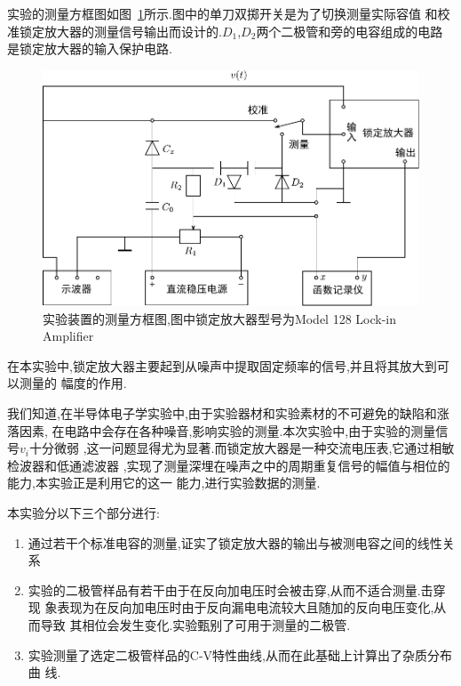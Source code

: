 \documentclass[aps,pre,12pt,preprint,onecolumn,showpacs,showkeys]{revtex4-1}
\begin{document}
实验的测量方框图如图~\ref{fig:ins}所示.图中的单刀双掷开关是为了切换测量实际容值
和校准锁定放大器的测量信号输出而设计的.$D_1$,$D_2$两个二极管和旁的电容组成的电路
是锁定放大器的输入保护电路.

\begin{figure}[htbp]
    \centering
    \includegraphics[width=\textwidth]{drawing.pdf}
    \caption{\label{fig:ins}
        实验装置的测量方框图,图中锁定放大器型号为Model 128 Lock-in Amplifier}
\end{figure}

在本实验中,锁定放大器主要起到从噪声中提取固定频率的信号,并且将其放大到可以测量的
幅度的作用.

我们知道,在半导体电子学实验中,由于实验器材和实验素材的不可避免的缺陷和涨落因素,
在电路中会存在各种噪音,影响实验的测量.本次实验中,由于实验的测量信号$v_i$十分微弱
,这一问题显得尤为显著.而锁定放大器是一种交流电压表,它通过相敏检波器和低通滤波器
,实现了测量深埋在噪声之中的周期重复信号的幅值与相位的能力,本实验正是利用它的这一
能力,进行实验数据的测量.

本实验分以下三个部分进行:

\begin{enumerate}
    \item 通过若干个标准电容的测量,证实了锁定放大器的输出与被测电容之间的线性关
        系
    \item 实验的二极管样品有若干由于在反向加电压时会被击穿,从而不适合测量.击穿现
        象表现为在反向加电压时由于反向漏电电流较大且随加的反向电压变化,从而导致
        其相位会发生变化.实验甄别了可用于测量的二极管.
    \item 实验测量了选定二极管样品的C-V特性曲线,从而在此基础上计算出了杂质分布曲
        线.
\end{enumerate}
\end{document}
